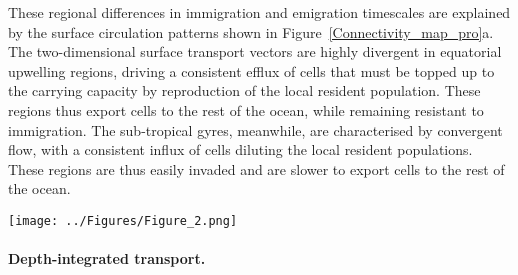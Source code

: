 \documentclass[12pt]{article}
\begin{document}
These regional differences in immigration and emigration timescales are explained by the surface circulation patterns shown in Figure~\ref{Connectivity_map_pro}a. The two-dimensional surface transport vectors are highly divergent in equatorial upwelling regions, driving a consistent efflux of cells that must be topped up to the carrying capacity by reproduction of the local resident population. These regions thus export cells to the rest of the ocean, while remaining resistant to immigration. The sub-tropical gyres, meanwhile, are characterised by convergent flow, with a consistent influx of cells diluting the local resident populations. These regions are thus easily invaded and are slower to export cells to the rest of the ocean. 



\begin{figure*}[htp]
\centering
\texttt{[image: ../Figures/Figure\_2.png]}
    \\
    \caption{Immigration and emigration timescales (years) for ecologically neutral \textit{Prochlorococcus} subpopulations, given (a) surface only transport, and (b) depth-integrated transport. Taxonomically distinct subpopulations were seeded in each of the 94 locations marked with dots. Emigration times, represented by the coloured dots, are defined as the time taken for each seed subpopulation to disperse to 95\% of all locations). Immigration times, represented by the background colours, are defined as the time taken for 95\% of all seed subpopulations to arrive in each location. Planktonic transport velocities are shown as vectors. (c) Relative changes in global immigration and emigration times when switching from surface-only to depth-integrated transport (b$\div$a).}
\label{Connectivity_map_pro}
\end{figure*}

\paragraph{Depth-integrated transport.}
\end{document}
